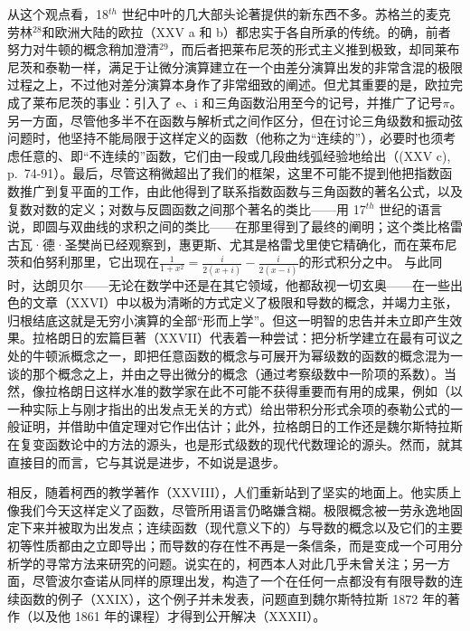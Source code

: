 从这个观点看，18\(^{th}\) 世纪中叶的几大部头论著提供的新东西不多。苏格兰的麦克劳林\(^{28}\)和欧洲大陆的欧拉（XXV a 和 b）都忠实于各自所承的传统。的确，前者努力对牛顿的概念稍加澄清\(^{29}\)，而后者把莱布尼茨的形式主义推到极致，却同莱布尼茨和泰勒一样，满足于让微分演算建立在一个由差分演算出发的非常含混的极限过程之上，不过他对差分演算本身作了非常细致的阐述。但尤其重要的是，欧拉完成了莱布尼茨的事业：引入了 e、i 和三角函数沿用至今的记号，并推广了记号\(\pi\)。另一方面，尽管他多半不在函数与解析式之间作区分，但在讨论三角级数和振动弦问题时，他坚持不能局限于这样定义的函数（他称之为“连续的”），必要时也须考虑任意的、即“不连续的”函数，它们由一段或几段曲线弧经验地给出（(XXV c), p.~74-91）。最后，尽管这稍微超出了我们的框架，这里不可能不提到他把指数函数推广到复平面的工作，由此他得到了联系指数函数与三角函数的著名公式，以及复数对数的定义；对数与反圆函数之间那个著名的类比——用 17\(^{th}\) 世纪的语言说，即圆与双曲线的求积之间的类比——在那里得到了最终的阐明；这个类比格雷古瓦·德·圣樊尚已经观察到，惠更斯、尤其是格雷戈里使它精确化，而在莱布尼茨和伯努利那里，它出现在\(\frac{1}{1 + x^{2}} = \frac{i}{2(x + i)} - \frac{i}{2(x - i)}\)的形式积分之中。
\relax{}
与此同时，达朗贝尔——无论在数学中还是在其它领域，他都敌视一切玄奥——在一些出色的文章（XXVI）中以极为清晰的方式定义了极限和导数的概念，并竭力主张，归根结底这就是无穷小演算的全部“形而上学”。但这一明智的忠告并未立即产生效果。拉格朗日的宏篇巨著（XXVII）代表着一种尝试：把分析学建立在最有可议之处的牛顿派概念之一，即把任意函数的概念与可展开为幂级数的函数的概念混为一谈的那个概念之上，并由之导出微分的概念（通过考察级数中一阶项的系数）。当然，像拉格朗日这样水准的数学家在此不可能不获得重要而有用的成果，例如（以一种实际上与刚才指出的出发点无关的方式）给出带积分形式余项的泰勒公式的一般证明，并借助中值定理对它作出估计；此外，拉格朗日的工作还是魏尔斯特拉斯在复变函数论中的方法的源头，也是形式级数的现代代数理论的源头。然而，就其直接目的而言，它与其说是进步，不如说是退步。

相反，随着柯西的教学著作（XXVIII），人们重新站到了坚实的地面上。他实质上像我们今天这样定义了函数，尽管所用语言仍略嫌含糊。极限概念被一劳永逸地固定下来并被取为出发点；连续函数（现代意义下的）与导数的概念以及它们的主要初等性质都由之立即导出；而导数的存在性不再是一条信条，而是变成一个可用分析学的寻常方法来研究的问题。说实在的，柯西本人对此几乎未曾关注；另一方面，尽管波尔查诺从同样的原理出发，构造了一个在任何一点都没有有限导数的连续函数的例子（XXIX），这个例子并未发表，问题直到魏尔斯特拉斯 1872 年的著作（以及他 1861 年的课程）才得到公开解决（XXXII）。

